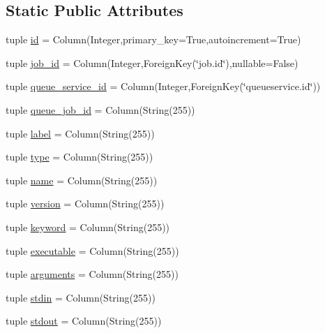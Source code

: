 \subsection*{\-Static \-Public \-Attributes}
\begin{DoxyCompactItemize}
\item 
tuple \hyperlink{classcyberweb_1_1model_1_1job_1_1_task_a6b2bee4f07e3bd54f17d405471728be3}{id} = \-Column(\-Integer,primary\-\_\-key=\-True,autoincrement=\-True)
\item 
tuple \hyperlink{classcyberweb_1_1model_1_1job_1_1_task_ad9067f2b58de1146917e80032dad7402}{job\-\_\-id} = \-Column(\-Integer,\-Foreign\-Key(\char`\"{}job.\-id\char`\"{}),nullable=\-False)
\item 
tuple \hyperlink{classcyberweb_1_1model_1_1job_1_1_task_ab734977585355fda9b7924f3bad051d2}{queue\-\_\-service\-\_\-id} = \-Column(\-Integer,\-Foreign\-Key(\char`\"{}queueservice.\-id\char`\"{}))
\item 
tuple \hyperlink{classcyberweb_1_1model_1_1job_1_1_task_a6e6d8dbd44be1c36d719a5406061db49}{queue\-\_\-job\-\_\-id} = \-Column(\-String(255))
\item 
tuple \hyperlink{classcyberweb_1_1model_1_1job_1_1_task_a137722ad051da36d2d7458f556cd5eef}{label} = \-Column(\-String(255))
\item 
tuple \hyperlink{classcyberweb_1_1model_1_1job_1_1_task_a21d8b0adec04876418c604c51ce82e90}{type} = \-Column(\-String(255))
\item 
tuple \hyperlink{classcyberweb_1_1model_1_1job_1_1_task_a2f9f4113b25b7903c6f9ead7d3ce5375}{name} = \-Column(\-String(255))
\item 
tuple \hyperlink{classcyberweb_1_1model_1_1job_1_1_task_ab6303edd971d2cda66d12ab24a1f88ac}{version} = \-Column(\-String(255))
\item 
tuple \hyperlink{classcyberweb_1_1model_1_1job_1_1_task_a880014f804417353c8f5ad3a0ff31175}{keyword} = \-Column(\-String(255))
\item 
tuple \hyperlink{classcyberweb_1_1model_1_1job_1_1_task_a236e10d3584df4bbe475f3922ab7b5e9}{executable} = \-Column(\-String(255))
\item 
tuple \hyperlink{classcyberweb_1_1model_1_1job_1_1_task_a2195bb12d1614492b53748800866fadd}{arguments} = \-Column(\-String(255))
\item 
tuple \hyperlink{classcyberweb_1_1model_1_1job_1_1_task_a2fc29a74a5ceeb00c4c196ee44d1fc70}{stdin} = \-Column(\-String(255))
\item 
tuple \hyperlink{classcyberweb_1_1model_1_1job_1_1_task_a634056f2e4b74a4541373de4be6e3f6f}{stdout} = \-Column(\-String(255))

\end{DoxyCompactItemize}
